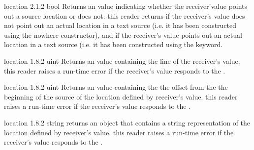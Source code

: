 {location}
{2.1.2}
{bool}
{Returns an  value indicating whether the receiver'value points out a source location or does not.}
{this reader returns  if the receiver's value does not point out an actual location in a text source (i.e. it has been constructed using the nowhere constructor), and  if the receiver's value points out an actual location in a text source (i.e. it has been constructed using the  keyword.}


{location}
{1.8.2}
{uint}
{Returns an  value containing the line of the receiver's value.}
{this reader raises a run-time error if the receiver's value responds  to the .}


{location}
{1.8.2}
{uint}
{Returns an  value containing the the offset from the the beginning of the source of the location defined by receiver's value.}
{this reader raises a run-time error if the receiver's value responds  to the .}


{location}
{1.8.2}
{string}
{returns an  object that contains a string representation of the location defined by receiver's value.}
{this reader raises a run-time error if the receiver's value responds  to the .}
